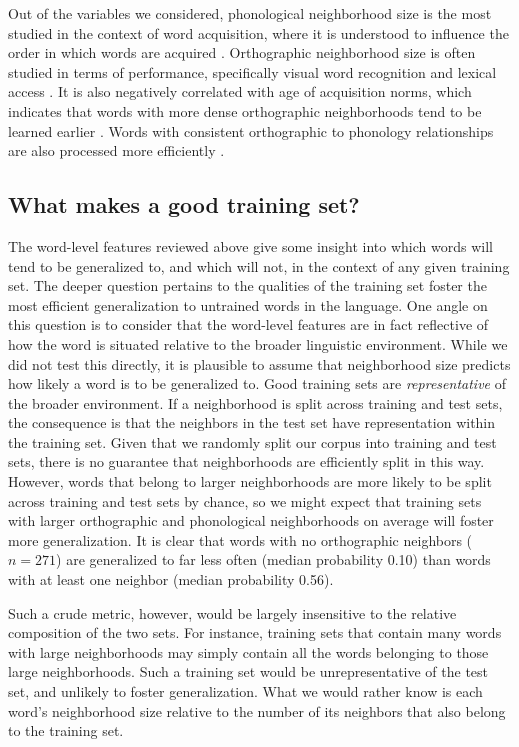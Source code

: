 \documentclass[10pt,letterpaper]{article}
\begin{document}
Out of the variables we considered, phonological neighborhood size is the most studied in the context of word acquisition, where it is understood to influence the order in which words are acquired \cite{Storkel2003}.
Orthographic neighborhood size is often studied in terms of performance, specifically visual word recognition and lexical access \cite{Andrews1997}.
It is also negatively correlated with age of acquisition norms, which indicates that words with more dense orthographic neighborhoods tend to be learned earlier \cite{Cameirao2010}.
Words with consistent orthographic to phonology relationships are also processed more efficiently \cite{Ziegler2004}.

\subsection{What makes a good training set?}
The word-level features reviewed above give some insight into which words will tend to be generalized to, and which will not, in the context of any given training set.
The deeper question pertains to the qualities of the training set foster the most efficient generalization to untrained words in the language.
One angle on this question is to consider that the word-level features are in fact reflective of how the word is situated relative to the broader linguistic environment.
While we did not test this directly, it is plausible to assume that neighborhood size predicts how likely a word is to be generalized to.
Good training sets are \textit{representative} of the broader environment.
If a neighborhood is split across training and test sets, the consequence is that the neighbors in the test set have representation within the training set.
Given that we randomly split our corpus into training and test sets, there is no guarantee that neighborhoods are efficiently split in this way.
However, words that belong to larger neighborhoods are more likely to be split across training and test sets by chance, so we might expect that training sets with larger orthographic and phonological neighborhoods on average will foster more generalization.
It is clear that words with no orthographic neighbors ($n = 271$) are generalized to far less often (median probability 0.10) than words with at least one neighbor (median probability 0.56).

Such a crude metric, however, would be largely insensitive to the relative composition of the two sets.
For instance, training sets that contain many words with large neighborhoods may simply contain all the words belonging to those large neighborhoods.
Such a training set would be unrepresentative of the test set, and unlikely to foster generalization.
What we would rather know is each word's neighborhood size relative to the number of its neighbors that also belong to the training set.
\end{document}
